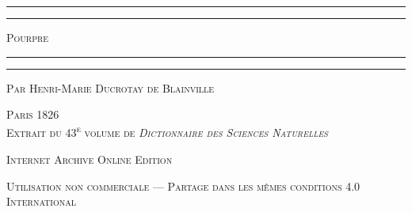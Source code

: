 \documentclass[a4paper, 11pt, oneside, polutonikogreek, french]{article}
\begin{document}
\begin{titlepage} %
	\centering %

	
	\rule{\textwidth}{1.6pt}\vspace*{-\baselineskip}\vspace*{2pt} %
	\rule{\textwidth}{0.4pt} %
	
	\vspace{1\baselineskip} %
	
	{\scshape\Huge Pourpre}
	
	\vspace{1\baselineskip} %

	\rule{\textwidth}{0.4pt}\vspace*{-\baselineskip}\vspace{3.2pt} %
	\rule{\textwidth}{1.6pt} %
	
	\vspace{1\baselineskip} %
	
	
	{\scshape Par \Large Henri-Marie Ducrotay de Blainville} %
	
	\vspace*{1\baselineskip} %
    
        \vspace*{\fill}

	\vspace{1\baselineskip}

	{\small\scshape Paris 1826 \\ Extrait du 43\textsuperscript{e} volume de \emph{Dictionnaire des Sciences Naturelles}}
		
	\vspace{0.5\baselineskip} %

        \scshape Internet Archive Online Edition  %
	
	{\scshape\small Utilisation non commerciale --- Partage dans les mêmes conditions 4.0 International} %
\end{titlepage}
\setlength{\parskip}{1mm plus1mm minus1mm}
\clearpage
\end{document}
